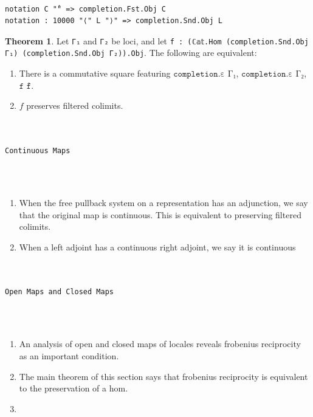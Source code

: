 \documentclass{book}
\theoremstyle{definition}
\newtheorem{theorem}{Theorem}
\newcounter{lcounter}
\renewcommand{\chapter}[1]{
\newpage
{
\Huge 
\begin{center}
\ \\
\ \\
\thispagestyle{empty}
\texttt{#1}
\end{center}}
\ \\
\ \\
}
\begin{document}
\begin{center}
\begin{tcolorbox}[width=5in,colback={white},title={\begin{center}\texttt{Lean \thelcounter} \addtocounter{lcounter}{1}  \end{center}},colbacktitle=Blue,coltitle=black]
\begin{verbatim}

notation C "̂" => completion.Fst.Obj C
notation : 10000 "⟨" L "⟩" => completion.Snd.Obj L

\end{verbatim}
\end{tcolorbox}
\end{center}

\begin{theorem}
Let \texttt{Γ₁} and \texttt{Γ₂} be loci, and let \texttt{f : (ℂ𝕒𝕥.Hom (completion.Snd.Obj Γ₁) (completion.Snd.Obj Γ₂)).Obj}. The following are equivalent:
\begin{enumerate}
\item There is a commutative square featuring $\texttt{completion.ε Γ₁}$, $\texttt{completion.ε Γ₂}$, $\texttt{f}$ $\texttt{f̂}$.
\item $f$ preserves filtered colimits.
\end{enumerate}
\end{theorem}

\chapter{Continuous Maps}

\begin{enumerate}
\item When the free pullback system on a representation has an adjunction, we say that the original map is continuous. This is equivalent to preserving filtered colimits.
\item When a left adjoint has a continuous right adjoint, we say it is continuous
\end{enumerate}

\chapter{Open Maps and Closed Maps}

\begin{enumerate}
\item An analysis of open and closed maps of locales reveals frobenius reciprocity as an important condition.
\item The main theorem of this section says that frobenius reciprocity is equivalent to the preservation of a hom.
\item 
\end{enumerate}
\end{document}
